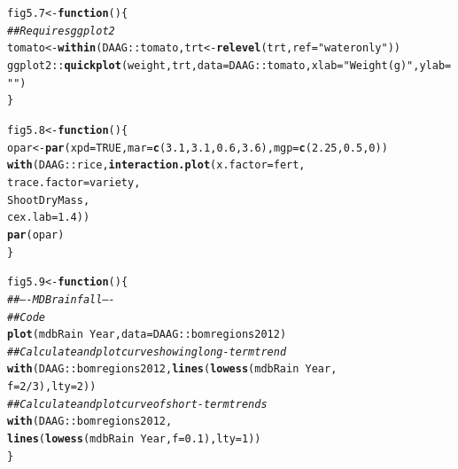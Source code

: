 \documentclass[12pt, a4paper,  BCOR=8.25mm, DIV=15]{scrartcl}\usepackage[]{graphicx}\usepackage[]{color}
\makeatletter
\newcommand{\hlnum}[1]{\textcolor[rgb]{0.686,0.059,0.569}{#1}}%
\newcommand{\hlstr}[1]{\textcolor[rgb]{0.192,0.494,0.8}{#1}}%
\newcommand{\hlcom}[1]{\textcolor[rgb]{0.678,0.584,0.686}{\textit{#1}}}%
\newcommand{\hlopt}[1]{\textcolor[rgb]{0,0,0}{#1}}%
\newcommand{\hlstd}[1]{\textcolor[rgb]{0.345,0.345,0.345}{#1}}%
\newcommand{\hlkwa}[1]{\textcolor[rgb]{0.161,0.373,0.58}{\textbf{#1}}}%
\newcommand{\hlkwb}[1]{\textcolor[rgb]{0.69,0.353,0.396}{#1}}%
\newcommand{\hlkwc}[1]{\textcolor[rgb]{0.333,0.667,0.333}{#1}}%
\newcommand{\hlkwd}[1]{\textcolor[rgb]{0.737,0.353,0.396}{\textbf{#1}}}%
\newenvironment{kframe}{%
 \def\at@end@of@kframe{}%
 \ifinner\ifhmode%
  \def\at@end@of@kframe{\end{minipage}}%
  \begin{minipage}{\columnwidth}%
 \fi\fi%
 \def\FrameCommand##1{\hskip\@totalleftmargin \hskip-\fboxsep
 \colorbox{shadecolor}{##1}\hskip-\fboxsep
     \hskip-\linewidth \hskip-\@totalleftmargin \hskip\columnwidth}%
 \MakeFramed {\advance\hsize-\width
   \@totalleftmargin\z@ \linewidth\hsize
   \@setminipage}}%
 {\par\unskip\endMakeFramed%
 \at@end@of@kframe}
\newenvironment{knitrout}{}{} %
\makeatother
\begin{document}
\begin{knitrout}
\color{fgcolor}\begin{kframe}
\begin{alltt}
\hlstd{fig5.7} \hlkwb{<-} \hlkwa{function}\hlstd{()\{}
\hlcom{## Requires ggplot2}
\hlstd{tomato} \hlkwb{<-} \hlkwd{within}\hlstd{(DAAG}\hlopt{::}\hlstd{tomato, trt} \hlkwb{<-} \hlkwd{relevel}\hlstd{(trt,} \hlkwc{ref}\hlstd{=}\hlstr{"water only"}\hlstd{))}
\hlstd{ggplot2}\hlopt{::}\hlkwd{quickplot}\hlstd{(weight, trt,} \hlkwc{data}\hlstd{=DAAG}\hlopt{::}\hlstd{tomato,} \hlkwc{xlab}\hlstd{=}\hlstr{"Weight (g)"}\hlstd{,} \hlkwc{ylab}\hlstd{=}\hlstr{""}\hlstd{)}
\hlstd{\}}
\end{alltt}
\end{kframe}
\end{knitrout}

\begin{knitrout}
\color{fgcolor}\begin{kframe}
\begin{alltt}
\hlstd{fig5.8} \hlkwb{<-} \hlkwa{function}\hlstd{()\{}
\hlstd{opar} \hlkwb{<-} \hlkwd{par}\hlstd{(}\hlkwc{xpd}\hlstd{=}\hlnum{TRUE}\hlstd{,} \hlkwc{mar}\hlstd{=}\hlkwd{c}\hlstd{(}\hlnum{3.1}\hlstd{,}\hlnum{3.1}\hlstd{,}\hlnum{0.6}\hlstd{,}\hlnum{3.6}\hlstd{),} \hlkwc{mgp}\hlstd{=}\hlkwd{c}\hlstd{(}\hlnum{2.25}\hlstd{,} \hlnum{0.5}\hlstd{,} \hlnum{0}\hlstd{))}
\hlkwd{with}\hlstd{(DAAG}\hlopt{::}\hlstd{rice,} \hlkwd{interaction.plot}\hlstd{(}\hlkwc{x.factor}\hlstd{=fert,}
                            \hlkwc{trace.factor}\hlstd{=variety,}
                            \hlstd{ShootDryMass,}
                            \hlkwc{cex.lab}\hlstd{=}\hlnum{1.4}\hlstd{))}
\hlkwd{par}\hlstd{(opar)}
\hlstd{\}}
\end{alltt}
\end{kframe}
\end{knitrout}

\begin{knitrout}
\color{fgcolor}\begin{kframe}
\begin{alltt}
\hlstd{fig5.9} \hlkwb{<-} \hlkwa{function}\hlstd{()\{}
\hlcom{## ---- MDBrainfall ----}
\hlcom{## Code}
\hlkwd{plot}\hlstd{(mdbRain} \hlopt{~} \hlstd{Year,} \hlkwc{data}\hlstd{=DAAG}\hlopt{::}\hlstd{bomregions2012)}
\hlcom{## Calculate and plot curve showing long-term trend}
\hlkwd{with}\hlstd{(DAAG}\hlopt{::}\hlstd{bomregions2012,} \hlkwd{lines}\hlstd{(}\hlkwd{lowess}\hlstd{(mdbRain} \hlopt{~} \hlstd{Year,}
                           \hlkwc{f}\hlstd{=}\hlnum{2}\hlopt{/}\hlnum{3}\hlstd{),} \hlkwc{lty}\hlstd{=}\hlnum{2}\hlstd{))}
\hlcom{## Calculate and plot curve of short-term trends}
\hlkwd{with}\hlstd{(DAAG}\hlopt{::}\hlstd{bomregions2012,}
     \hlkwd{lines}\hlstd{(}\hlkwd{lowess}\hlstd{(mdbRain} \hlopt{~} \hlstd{Year,} \hlkwc{f}\hlstd{=}\hlnum{0.1}\hlstd{),} \hlkwc{lty}\hlstd{=}\hlnum{1}\hlstd{))}
\hlstd{\}}
\end{alltt}
\end{kframe}
\end{knitrout}
\end{document}
